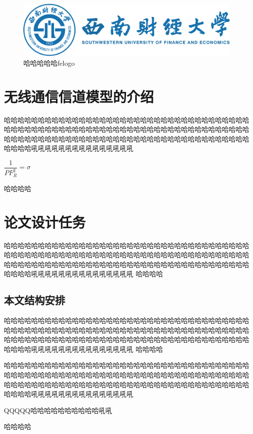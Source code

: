 \documentclass[UTF8,twoside,zihao=-4]{ctexbook}
\begin{document}
\begin{figure}
	\centering
	\includegraphics[width=0.7\linewidth]{pic_of_cover/swufelogo}
	\caption{哈哈哈哈哈felogo}
	\label{fig:swufelogo}
\end{figure}
	
	\section{无线通信信道模型的介绍}
	哈哈哈哈哈哈哈哈哈哈哈哈哈哈哈哈哈哈哈哈哈哈哈哈哈哈哈哈哈哈哈哈哈哈哈哈哈哈哈哈哈哈哈哈哈哈哈哈哈哈哈哈哈哈哈哈哈哈哈哈哈哈哈哈哈哈哈哈哈哈哈哈哈哈哈哈哈哈哈哈哈哈哈哈哈哈哈哈哈哈哈哈哈哈哈哈哈哈哈哈哈哈哈哈哈哈哈哈哈哈哈哈吼吼吼吼吼吼吼吼吼吼吼吼吼吼吼
	
	$ \dfrac{1}{PF_R^2}=\sigma $
	
	哈哈哈哈
	\section{论文设计任务}
	哈哈哈哈哈哈哈哈哈哈哈哈哈哈哈哈哈哈哈哈哈哈哈哈哈哈哈哈哈哈哈哈哈哈哈哈哈哈哈哈哈哈哈哈哈哈哈哈哈哈哈哈哈哈哈哈哈哈哈哈哈哈哈哈哈哈哈哈哈哈哈哈哈哈哈哈哈哈哈哈哈哈哈哈哈哈哈哈哈哈哈哈哈哈哈哈哈哈哈哈哈哈哈哈哈哈哈哈哈哈哈哈吼吼吼吼吼吼吼吼吼吼吼吼吼吼吼
	哈哈哈哈
	\subsection{本文结构安排}
	哈哈哈哈哈哈哈哈哈哈哈哈哈哈哈哈哈哈哈哈哈哈哈哈哈哈哈哈哈哈哈哈哈哈哈哈哈哈哈哈哈哈哈哈哈哈哈哈哈哈哈哈哈哈哈哈哈哈哈哈哈哈哈哈哈哈哈哈哈哈哈哈哈哈哈哈哈哈哈哈哈哈哈哈哈哈哈哈哈哈哈哈哈哈哈哈哈哈哈哈哈哈哈哈哈哈哈哈哈哈哈哈吼吼吼吼吼吼吼吼吼吼吼吼吼吼吼
	哈哈哈哈

	哈哈哈哈哈哈哈哈哈哈哈哈哈哈哈哈哈哈哈哈哈哈哈哈哈哈哈哈哈哈哈哈哈哈哈哈哈哈哈哈哈哈哈哈哈哈哈哈哈哈哈哈哈哈哈哈哈哈哈哈哈哈哈哈哈哈哈哈哈哈哈哈哈哈哈哈哈哈哈哈哈哈哈哈哈哈哈哈哈哈哈哈哈哈哈哈哈哈哈哈哈哈哈哈哈哈哈哈哈哈哈哈吼吼吼吼吼吼吼吼吼吼吼吼吼吼吼
	
	QQQQQ\cite{2009}哈哈哈哈哈哈哈哈哈哈吼吼
	
	哈哈哈哈
\end{document}
